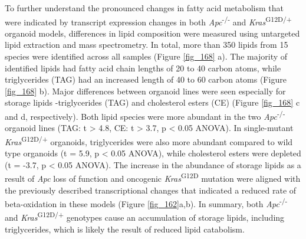 \begin{flushleft}
To further understand the pronounced changes in fatty acid metabolism that were indicated by transcript expression changes in both \textit{Apc}\textsuperscript{-/-}  and \textit{Kras}\textsuperscript{G12D/+} organoid models, differences in lipid composition were measured using untargeted lipid extraction and mass spectrometry. In total, more than 350 lipids from 15 species were identified across all samples (Figure \ref{fig_168} a). The majority of identified lipids had fatty acid chain lengths of 20 to 40 carbon atoms, while triglycerides (TAG) had an increased length of 40 to 60 carbon atoms (Figure \ref{fig_168} b). Major differences between organoid lines were seen especially for storage lipids -triglycerides (TAG) and cholesterol esters (CE) (Figure \ref{fig_168} c and d, respectively). Both lipid species were more abundant in the two \textit{Apc}\textsuperscript{-/-}  organoid lines (TAG: t > 4.8, CE: t > 3.7, p < 0.05 ANOVA). In single-mutant \textit{Kras}\textsuperscript{G12D/+} organoids, triglycerides were also more abundant compared to wild type organoids (t = 5.9, p < 0.05 ANOVA), while cholesterol esters were depleted (t = -3.7, p < 0.05 ANOVA). The increase in the abundance of storage lipids as a result of \textit{Apc} loss of function and oncogenic \textit{Kras}\textsuperscript{G12D} mutation were aligned with the previously described transcriptional changes that indicated a reduced rate of beta-oxidation in these models (Figure \ref{fig_162}a,b). In summary, both \textit{Apc}\textsuperscript{-/-}  and \textit{Kras}\textsuperscript{G12D/+} genotypes cause an accumulation of storage lipids, including triglycerides, which is likely the result of reduced lipid catabolism. 


\end{flushleft}

